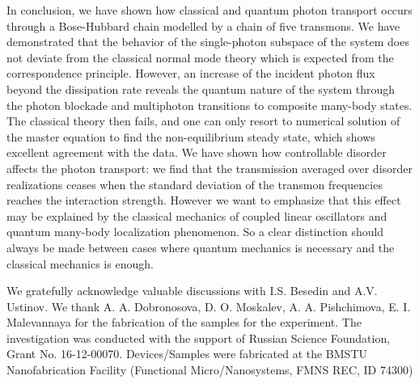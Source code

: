 \documentclass[%
 aps, pra,
 amsmath,amssymb,
 reprint,%
superscriptaddress
]{revtex4-2}
\begin{document}
In conclusion, we have shown how classical and quantum photon transport occurs through a Bose-Hubbard chain modelled by a chain of five transmons. We have demonstrated that the behavior of the single-photon subspace of the system does not deviate from the classical normal mode theory which is expected from the correspondence principle. However, an increase of the incident photon flux beyond the dissipation rate reveals the quantum nature of the system through the photon blockade and multiphoton transitions to composite many-body states. The classical theory then fails, and one can only resort to numerical solution of the master equation to find the non-equilibrium steady state, which shows excellent agreement with the data. We have shown how controllable disorder affects the photon transport: we find that the transmission averaged over disorder realizations ceases when the standard deviation of the transmon frequencies reaches the interaction strength. However we want to emphasize that this effect may be explained by the classical mechanics of coupled linear oscillators and quantum many-body localization phenomenon. So a clear distinction should always be made between cases where quantum mechanics is necessary and the classical mechanics is enough.

We gratefully acknowledge valuable discussions with I.S. Besedin and A.V. Ustinov. We thank  A. A. Dobronosova, D. O. Moskalev, A. A. Pishchimova, E. I. Malevannaya for the fabrication of the samples for the experiment. The investigation was conducted with the support of Russian Science Foundation, Grant No. 16-12-00070. Devices/Samples were fabricated at the BMSTU Nanofabrication Facility (Functional Micro/Nanosystems, FMNS REC, ID 74300)


\end{document}
